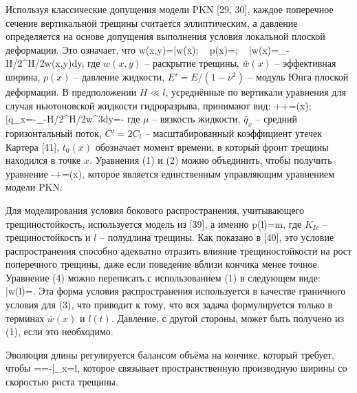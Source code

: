 \documentclass[main.tex]{subfiles}
\begin{document}
Используя классические допущения модели PKN [29, 30], каждое поперечное сечение вертикальной трещины считается эллиптическим, а давление определяется на основе допущения выполнения условия локальной плоской деформации.
Это означает, что
\beq
w(x,y)=\bar{w}(x);\,\,\,\,\,
p(x)=;\,\,\,\,\,
\bar{w}(x)=\int\limits_{-H/2}^{H/2}{w(x,y)dy},
\eeq
где $w(x,y)$ -- раскрытие трещины,
$\bar{w}(x)$ -- эффективная ширина,
$p(x)$ -- давление жидкости,
$E'=E/(1-\nu^2)$ -- модуль Юнга плоской деформации.
В предположении $H\ll l$, усреднённые по вертикали уравнения для случая ньютоновской жидкости гидроразрыва, принимают вид:
\beq
{}++=\delta(x);\,\,\,\,\,
\bar{q}_x=-\int\limits_{-H/2}^{H/2}w^3dy=-
\eeq
где
$\mu$ -- вязкость жидкости,
$\bar{q}_x$ -- средний горизонтальный поток,
$C'=2C_l$ -- масштабированный коэффициент утечек Картера [41],
$t_0(x)$ обозначает момент времени, в который фронт трещины находился в точке $x$.
Уравнения (1) и (2) можно объединить, чтобы получить уравнение
\beq
{}-+=\delta(x),
\eeq
которое является единственным управляющим уравнением модели PKN.

Для моделирования условия бокового распространения, учитывающего трещиностойкость, используется модель из [39], а именно
\beq
p(l)=m,
\eeq
где $K_{Ic}$ -- трещиностойкость и $l$ -- полудлина трещины.
Как показано в [40], это условие распространения способно адекватно отразить влияние трещиностойкости на рост поперечного трещины, даже если поведение вблизи кончика менее точное.
Уравнение (4) можно переписать с использованием (1) в следующем виде:
\beq
\bar{w}(l)=.
\eeq
Эта форма условия распространения используется в качестве граничного условия для (3), что приводит к тому, что вся задача формулируется только в терминах $\bar{w}(x)$ и $l(t)$.
Давление, с другой стороны, может быть получено из (1), если это необходимо.

Эволюция длины регулируется балансом объёма на кончике, который требует, чтобы
\beq
{}==-\bigg|_{x=l},
\eeq
которое связывает пространственную производную ширины со скоростью роста трещины.
\end{document}
